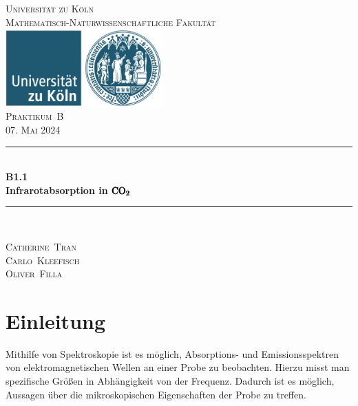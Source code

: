 \documentclass[12pt,a4paper]{scrartcl}
\numberwithin{equation}{section} %
\newcommand{\HRule}{\rule{\linewidth}{0.7mm}}
\begin{document}
\begin{titlepage}
	\pagestyle{empty}

	\begin{center}

	\textsc{\LARGE Universität zu Köln }\\ [0.4cm]
	\textsc{Mathematisch-Naturwissenschaftliche Fakultät} \\[1.5cm]

	\includegraphics[width=0.45\textwidth]{../media/uni.jpg}\\[1.5cm]  %

	\textsc{\Large Praktikum~B}\\[2mm]
	\textsc{07. Mai 2024}\\[10mm]
	\HRule \\[0.4cm]

		{	\Huge \bfseries B1.1}\\[0.4cm]
			{	\huge \bfseries Infrarotabsorption in $\pmb{\ce{CO_2}}$}\\[0.3cm]
	
	\HRule \\[3cm]

 	\begin{center}
		\textsc{\Large Catherine~Tran } \\[3pt]
		\textsc{\Large Carlo~Kleefisch } \\[3pt]
		\textsc{\Large Oliver~Filla } \\[3pt]
	\end{center}
	\end{center}
\end{titlepage}

\newpage
\tableofcontents
\newpage

\hypertarget{einleitung}{%
\section{Einleitung}\label{einleitung}}

Mithilfe von Spektroskopie ist es möglich, Absorptions- und Emissionsspektren von elektromagnetischen Wellen an einer Probe zu beobachten. Hierzu misst man spezifische Größen in Abhängigkeit von der Frequenz. Dadurch ist es möglich, Aussagen über die mikroskopischen Eigenschaften der Probe zu treffen.
\end{document}

